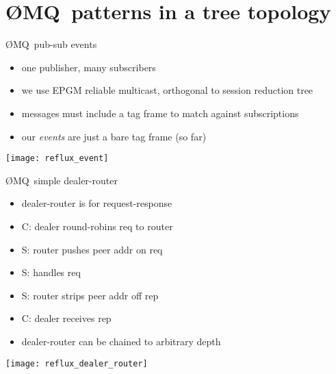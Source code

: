 \documentclass[default,pdf,colorBG,slideColor]{prosper}
\newcommand{\zMQ}{\O{}MQ}
\begin{document}
\part{\zMQ\ patterns in a tree topology}
\begin{slide}{\zMQ\ pub-sub events}{\small
\begin{minipage}{0.47\textwidth}
\begin{itemize}
  \item{one publisher, many subscribers}
  \item{we use EPGM reliable multicast,
        orthogonal to session reduction tree}
  \item{messages must include a tag frame to match against subscriptions}
  \item{our {\em events} are just a bare tag frame (so far)}
 \end{itemize}
\end{minipage}
\begin{minipage}{0.47\textwidth}
\begin{center}
  \texttt{[image: reflux\_event]}
\end{center}
\end{minipage}
}\end{slide}

\begin{slide}{\zMQ\ simple dealer-router}{\small
\begin{minipage}{0.68\textwidth}
\begin{itemize}
  \item{dealer-router is for request-response}
  \item{C: dealer round-robins req to router}
  \item{S: router pushes peer addr on req}
  \item{S: handles req}
  \item{S: router strips peer addr off rep}
  \item{C: dealer receives rep}
  \item{dealer-router can be chained to arbitrary depth}
 \end{itemize}
\end{minipage}
\begin{minipage}{0.28\textwidth}
\begin{center}
  \texttt{[image: reflux\_dealer\_router]}
\end{center}
\end{minipage}
}\end{slide}
\end{document}
